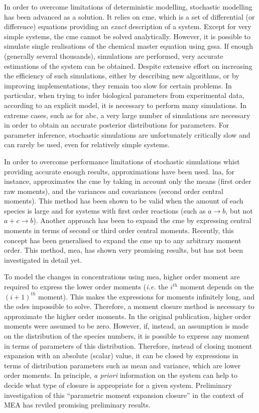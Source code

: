 In order to overcome limitations of deterministic modelling, stochastic modelling has been advanced as a solution.
It relies on \gls{cme}, which is a set of differential (or difference) equations providing an \emph{exact} description of a system.
Except for very simple systems, the \gls{cme} cannot be solved analytically.
However, it is possible to simulate single realisations of the chemical master equation using \gls{gssa}.
If enough (generally several thousands), simulations are performed, very accurate estimations of the system can be obtained.
Despite extensive effort on increasing the efficiency of such simulations, either by describing new algorithms, or by improving implementations,
they remain too slow for certain problems.
In particular, when trying to infer biological parameters from experimental data, according to an explicit model,
it is necessary to perform many simulations.
In extreme cases, such as for \gls{abc}, a very large number of simulations are necessary in order to obtain an accurate posterior distributions for parameters.
For parameter inference, stochastic simulations are unfortunately critically slow and can rarely be used, even for relatively simple systems.

In order to overcome performance limitations of stochastic simulations whist providing accurate enough results, approximations have been used.
\Gls{lna}, for instance, approximates the \gls{cme}
by taking in account only the means (first order raw moments), and the variances and covariances (second order central moments).
This method has been shown to be valid when the amount of each species is large and for systems with first order reactions
(such as  $a \rightarrow b$, but not $a + c  \rightarrow b$).
Another approach has been to expand the \gls{cme} by expressing central moments in terms of second or third order central moments.
Recently, this concept has been generalised to expand the \gls{cme} up to any arbitrary moment order\cite{ale_general_2013}.
This method, \gls{mea}, has shown very promising results, but has not been investigated in detail yet.

To model the changes in concentrations using \gls{mea}, higher order moment are required to express the lower order moments
(\emph{i.e.} the $i^{th}$ moment depends on the $(i+1)^{th}$ moment).
This makes the expressions for moments infinitely long, and the \glspl{ode} impossible to solve.
Therefore, a moment closure method is necessary to approximate the higher order moments.
In the original publication\cite{ale_general_2013}, higher order moments were assumed to be zero.
However, if, instead, an assumption is made on the distribution of the species numbers, it is possible to express any moment in terms of parameters of this distribution.
Therefore, instead of closing moment expansion with an absolute (scalar) value, it can be closed by expressions in terms of distribution parameters such as mean and variance, which are lower order
moments.
In principle, \emph{a priori} information on the system can help to decide what type of closure is appropriate for a given system.
Preliminary investigation of this ``parametric moment expansion closure'' in the context of MEA has reviled promising preliminary results.

